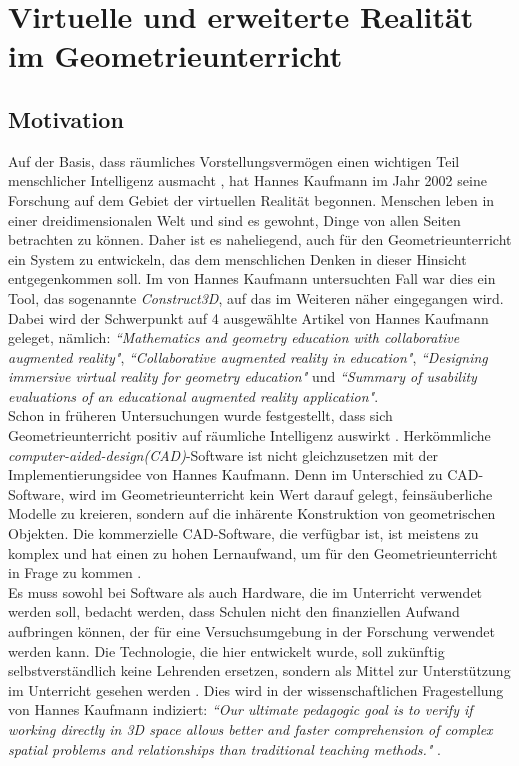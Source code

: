 \documentclass[deutsch]{llncs}
\begin{document}
\section{Virtuelle und erweiterte Realität im Geometrieunterricht}
\subsection{Motivation}
Auf der Basis, dass räumliches Vorstellungsvermögen einen wichtigen Teil menschlicher Intelligenz ausmacht \cite{spatial}, hat Hannes Kaufmann im Jahr 2002 seine Forschung auf dem Gebiet der virtuellen Realität begonnen.
Menschen leben in einer dreidimensionalen Welt und sind es gewohnt, Dinge von allen Seiten betrachten zu können. Daher ist es naheliegend, auch für den Geometrieunterricht ein System zu entwickeln,
das dem menschlichen Denken in dieser Hinsicht entgegenkommen soll. Im von Hannes Kaufmann untersuchten Fall war dies ein Tool, das sogenannte \emph{Construct3D}, auf das im Weiteren näher eingegangen wird. Dabei wird der Schwerpunkt auf 4 ausgewählte Artikel von Hannes Kaufmann geleget, nämlich:  \emph{``Mathematics and geometry education with collaborative augmented reality"}\cite{Kaufmann:2002:MGE:1242073.1242086}, \emph{``Collaborative augmented reality in education"}\cite{article}, \emph{``Designing immersive virtual reality for geometry education"} \cite{1667626} und \emph{``Summary of usability evaluations of an educational augmented reality application"}\cite{Kaufmann_summaryof}. \\

\noindent Schon in früheren Untersuchungen wurde festgestellt, dass sich Geometrieunterricht positiv auf räumliche Intelligenz auswirkt \cite{GittlerDifferentialTO}.
Herkömmliche  \emph{computer-aided-design(CAD)}-Software  ist nicht gleichzusetzen mit der Implementierungsidee von Hannes Kaufmann. Denn im Unterschied zu CAD-Software, wird im Geometrieunterricht kein Wert darauf gelegt, feinsäuberliche Modelle zu kreieren, sondern auf die inhärente Konstruktion von geometrischen Objekten. Die kommerzielle CAD-Software, die verfügbar ist, ist meistens zu komplex und hat einen zu hohen Lernaufwand, um für den Geometrieunterricht in Frage zu kommen  \cite{Kaufmann:2002:MGE:1242073.1242086}. \\
Es muss sowohl bei Software als auch Hardware, die im Unterricht verwendet werden soll, bedacht werden, dass Schulen nicht den finanziellen Aufwand aufbringen können, der für eine Versuchsumgebung in der Forschung verwendet werden kann.  Die Technologie, die hier entwickelt wurde, soll zukünftig selbstverständlich keine Lehrenden ersetzen, sondern als Mittel zur Unterstützung im Unterricht gesehen werden \cite{article}. Dies wird in der wissenschaftlichen Fragestellung von Hannes Kaufmann indiziert: \emph{``Our ultimate pedagogic goal is to verify if working directly in 3D space allows better and faster comprehension of complex spatial problems and relationships than traditional teaching methods."} \cite{1667626}. \\
\end{document}
